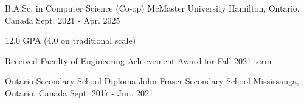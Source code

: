 

\begin{cventries}

  \cventry
    {B.A.Sc. in Computer Science (Co-op)} %
    {McMaster University} %
    {Hamilton, Ontario, Canada} %
    {Sept. 2021 - Apr. 2025} %
    {
    \begin{cvitems}
      \item 12.0 GPA (4.0 on traditional scale)
      \item {Received Faculty of Engineering Achievement Award for Fall 2021 term}
    \end{cvitems}
    }

  \cventry
    {Ontario Secondary School Diploma} %
    {John Fraser Secondary School} %
    {Mississauga, Ontario, Canada} %
    {Sept. 2017 - Jun. 2021} %
    {
    }

\end{cventries}
